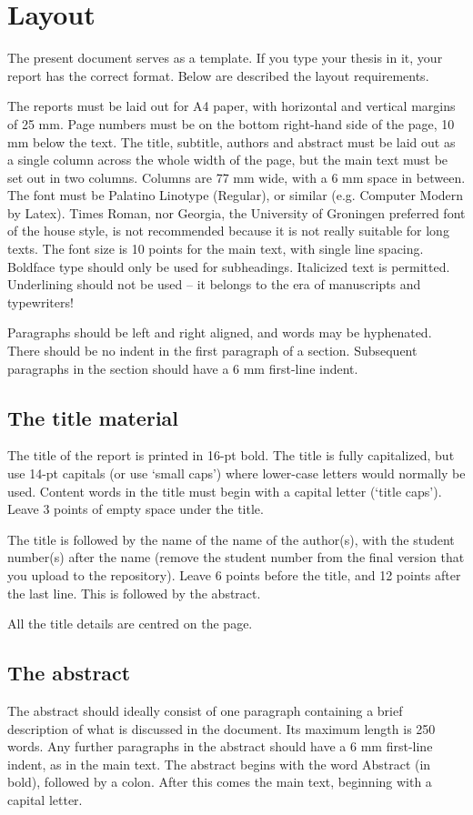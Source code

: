 \section{Layout}\label{sec:layout}
The present document serves as a template. If you type your thesis in it, your report has the correct format. Below are described the layout requirements.

The reports must be laid out for A4 paper, with horizontal and vertical margins of 25 mm. Page numbers must be on the bottom right-hand side of the page, 10 mm below the text. The title, subtitle, authors and abstract must be laid out as a single column across the whole width of the page, but the main text must be set out in two columns. Columns are 77 mm wide, with a 6 mm space in between.
The font must be Palatino Linotype (Regular), or similar (e.g. Computer Modern by Latex). Times Roman, nor Georgia, the University of Groningen preferred font of the house style, is not recommended because it is not really suitable for long texts. The font size is 10 points for the main text, with single line spacing. Boldface type should only be used for subheadings. Italicized text is permitted. Underlining should not be used – it belongs to the era of manuscripts and typewriters!

Paragraphs should be left and right aligned, and words may be hyphenated. There should be no indent in the first paragraph of a section. Subsequent paragraphs in the section should have a 6 mm first-line indent.

\subsection{The title material}\label{sec:_title_material}
The title of the report is printed in 16-pt bold. The title is fully capitalized, but use 14-pt capitals (or use `small caps') where lower-case letters would normally be used.  Content words in the title must begin with a capital letter (`title caps'). Leave 3 points of empty space under the title.

The title is followed by the name of the name of the author(s), with the student number(s) after the name (remove the student number from the final version that you upload to the repository).
Leave 6 points before the title, and 12 points after the last line. This is followed by the abstract.

All the title details are centred on the page.

\subsection{The abstract}\label{sec:_abstract_layout}
The abstract should ideally consist of one paragraph containing a brief description of what is discussed in the document. Its maximum length is 250 words. Any further paragraphs in the abstract should have a 6 mm first-line indent, as in the main text. The abstract begins with the word Abstract (in bold), followed by a colon. After this comes the main text, beginning with a capital letter.

